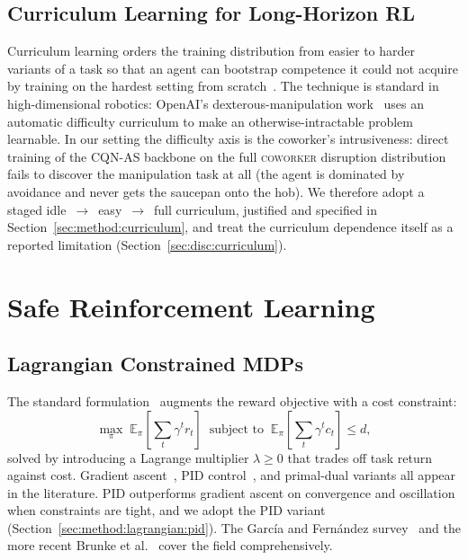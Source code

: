 \documentclass[11pt,a4paper]{report}
\newcommand{\cqnas}{CQN-AS}
\newcommand{\coworker}{\textsc{coworker}}
\begin{document}
\subsection{Curriculum Learning for Long-Horizon RL}
\label{sec:bg:rl:curriculum}

Curriculum learning orders the training distribution from easier to
harder variants of a task so that an agent can bootstrap competence
it could not acquire by training on the hardest setting from
scratch~\cite{narvekar2020curriculum}. The technique is standard in
high-dimensional robotics: OpenAI's dexterous-manipulation
work~\cite{openai2019solving} uses an automatic difficulty
curriculum to make an otherwise-intractable problem learnable. In
our setting the difficulty axis is the coworker's intrusiveness:
direct training of the \cqnas{} backbone on the full
\coworker{} disruption distribution fails to discover the
manipulation task at all (the agent is dominated by avoidance and
never gets the saucepan onto the hob). We therefore adopt a staged
idle~$\rightarrow$~easy~$\rightarrow$~full curriculum, justified and
specified in Section~\ref{sec:method:curriculum}, and treat the
curriculum dependence itself as a reported limitation
(Section~\ref{sec:disc:curriculum}).

\section{Safe Reinforcement Learning}
\label{sec:bg:safe}

\subsection{Lagrangian Constrained MDPs}
\label{sec:bg:safe:lagr}

The standard formulation~\cite{altman1999constrained,
ray2019safetygym} augments the reward objective with a cost
constraint:
\begin{equation}
  \max_{\pi} \;\mathbb{E}_{\pi}\!\left[\sum_t \gamma^t r_t\right]
  \;\;\text{subject to}\;\;
  \mathbb{E}_{\pi}\!\left[\sum_t \gamma^t c_t\right] \le d,
  \label{eq:cmdp}
\end{equation}
solved by introducing a Lagrange multiplier $\lambda \ge 0$ that
trades off task return against cost. Gradient
ascent~\cite{ray2019safetygym,achiam2017cpo}, PID
control~\cite{stooke2020pid}, and primal-dual variants all appear in
the literature. PID outperforms gradient ascent on convergence and
oscillation when constraints are tight, and we adopt the PID variant
(Section~\ref{sec:method:lagrangian:pid}). The García and
Fernández survey~\cite{garcia2015comprehensive} and the more
recent Brunke et al.~\cite{brunke2022safelearning} cover the field
comprehensively.
\end{document}
